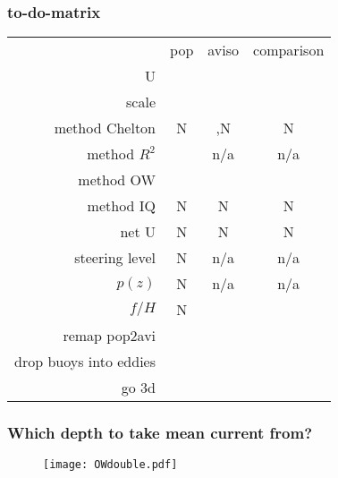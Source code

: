 
\newcommand{\cg}[1]{\cellcolor{green!25}#1}
\newcommand{\ce}[1]{\cellcolor{red!25}#1}
\newcommand{\cb}[1]{\cellcolor{gray!25}#1}
\newcommand{\n}{n/a}
\newcommand{\citeP}{\cite{Petersen2013}}
\newcommand{\citeCs}{\cite{Chelton2007}}
\newcommand{\citeCe}{\cite{Chelton2011}}
\newcommand{\citeCes}{\cite{Chelton2011,Chelton2007}}
\begin{frame}
 \frametitle{to-do-matrix}
 \begin{small} 
\begin{tabular}{r|c|c|c|}
\multicolumn{1}{c}{}	& \multicolumn{1}{c}{pop}	&	\multicolumn{1}{c}{aviso}	&	\multicolumn{1}{c}{comparison}\\
\cline{2-4}
U						&	\cg{\citeP}				&		\cg{\citeCes}			&		\cg{\citeP}	\\
\cline{2-4}
scale					&	\cg{\citeP}				&		\cg{\citeCes}			&		\cg{\citeP}	\\
\cline{2-4}
method Chelton			&	\ce{N}					&		\cg{\citeCe,N}			&		\ce{N}	\\
\cline{2-4}
method $R^2$			&	\cg{\citeP}				&		\cb{\n}					&		\cb{\n}	\\
\cline{2-4}
method OW				&	\cg{\citeP}				&		\cg{\citeCs}			&		\cg{\citeP}	\\
\cline{2-4}
method IQ				&	\ce{N}					&		\ce{N}					&		\ce{N}	\\
\cline{2-4}
net U					&	\ce{N}					&		\ce{N}					&		\ce{N}	\\
\cline{2-4}
steering level			&	\ce{N}					&		\cb{\n}					&		\cb{\n}	\\
\cline{2-4}
$p(z)$					&	\ce{N}					&		\cb{\n}					&		\cb{\n}	\\
\cline{2-4}
$f/H$					&	\ce{N}					&		\ce{ }					&		\ce{ }	\\
\cline{2-4}
remap pop2avi
&	\ce{ }					&		\ce{ }					&		\ce{ }	\\
\cline{2-4}
drop buoys into eddies
&	\ce{ }					&		\ce{ }					&		\ce{ }	\\
\cline{2-4}
go 3d
&	\ce{ }					&		\ce{ }					&		\ce{ }	\\
\cline{2-4}
\end{tabular}
\end{small}
\begin{tiny}


%
\end{tiny}
\end{frame}


%
%
%


\begin{frame}
\frametitle{Which depth to take mean current from?}
\begin{figure}
	\centering
\texttt{[image: OWdouble.pdf]}
\end{figure}
\end{frame}






